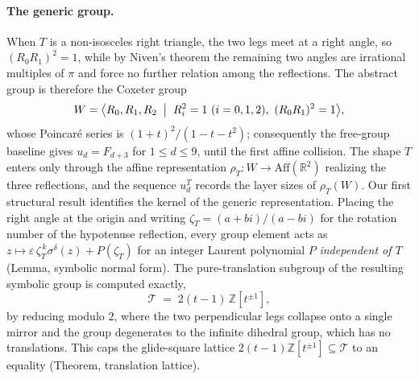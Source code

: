\documentclass[11pt]{article}
\theoremstyle{plain}
\theoremstyle{definition}
\theoremstyle{remark}
\newcommand{\Z}{\mathbb{Z}}
\newcommand{\R}{\mathbb{R}}
\newcommand{\Aff}{\mathrm{Aff}}
\begin{document}
\paragraph{The generic group.}
When $T$ is a non-isosceles right triangle, the two legs meet at a
right angle, so $(R_0R_1)^2=1$, while by Niven's theorem \cite{Niven1956} the remaining
two angles are irrational multiples of $\pi$ and force no further
relation among the reflections. The abstract group is therefore the
Coxeter group
\[
  W=\bigl\langle R_0,R_1,R_2 \;\bigm|\;
    R_i^2=1\ (i=0,1,2),\ (R_0R_1)^2=1 \bigr\rangle ,
\]
whose Poincar\'e series is $(1+t)^2/(1-t-t^2)$; consequently the
free-group baseline gives $u_d=F_{d+3}$ for $1\le d\le 9$, until the
first affine collision. The shape $T$ enters only through the affine
representation $\rho_T\colon W\to\Aff(\R^2)$ realizing the three
reflections, and the sequence $u_d^T$ records the layer sizes of
$\rho_T(W)$. Our first structural result identifies the kernel of the
generic representation. Placing the right angle at the origin and
writing $\zeta_T=(a+bi)/(a-bi)$ for the rotation number of the
hypotenuse reflection, every group element acts as
$z\mapsto \varepsilon\,\zeta_T^{\,k}\sigma^{\delta}(z)+P(\zeta_T)$ for an
integer Laurent polynomial $P$ \emph{independent of $T$}
(Lemma, symbolic normal form). The pure-translation subgroup of the
resulting symbolic group is computed exactly,
\[
  \mathcal T \;=\; 2(t-1)\,\Z[t^{\pm1}],
\]
by reducing modulo $2$, where the two perpendicular legs collapse onto
a single mirror and the group degenerates to the infinite dihedral
group, which has no translations. This caps the glide-square lattice
$2(t-1)\Z[t^{\pm1}]\subseteq\mathcal T$ to an equality
(Theorem, translation lattice).
\end{document}
